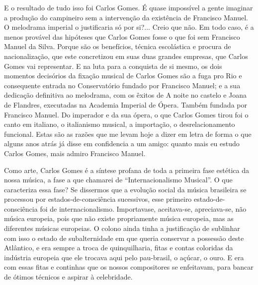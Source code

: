 E o resultado de tudo isso foi Carlos Gomes. É quase impossível a gente
imaginar a produção do campineiro sem a intervenção da existência de
Francisco Manuel. O melodrama imperial o justificaria só por si?...
Creio que não. Em todo caso, é a menos provável das hipóteses que Carlos
Gomes fosse o que foi sem Francisco Manuel da Silva. Porque são os
benefícios, técnica escolástica e procura de nacionalização, que este
concretizou em suas duas grandes empresas, que Carlos Gomes vai
representar. E na luta para a conquista de si mesmo, os dois momentos
decisórios da fixação musical de Carlos Gomes são a fuga pro Rio e
consequente entrada no Conservatório fundado por Francisco Manuel; e a
sua dedicação definitiva ao melodrama, com os êxitos de A noite no
castelo e Joana de Flandres, executadas na Academia Imperial de Ópera.
Também fundada por Francisco Manuel. Do imperador e da sua ópera, o que
Carlos Gomes tirou foi o canto em italiano, o italianismo musical, a
importação, o desrelacionamento funcional. Estas são as razões que me
levam hoje a dizer em letra de forma o que alguns anos atrás já disse em
confidencia a um amigo: quanto mais eu estudo Carlos Gomes, mais admiro
Francisco Manuel.

Como arte, Carlos Gomes é a síntese profana de toda a primeira fase
estética da nossa música, a fase a que chamarei de ``Internacionalismo
Musical''. O que caracteriza essa fase? Se dissermos que a evolução
social da música brasileira se processou por estados-de-consciência
sucessivos, esse primeiro estado-de-consciência foi de
internacionalismo. Importavase, aceitava-se, apreciava-se, não música
europeia, pois que não existe propriamente música europeia, mas as
diferentes músicas europeias. O colono ainda tinha a justificação de
sublinhar com isso o estado de subalternidade em que queria conservar a
possessão deste Atlântico, e era sempre a troca de quinquilharia, fitas
e contas coloridas da indústria europeia que ele trocava aqui pelo
pau-brasil, o açúcar, o ouro. E era com essas fitas e continhas que os
nossos compositores se enfeitavam, para bancar de ótimos técnicos e
aspirar à celebridade.

